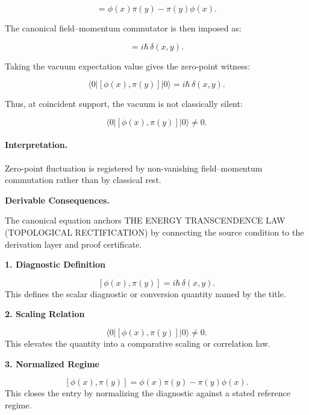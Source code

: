 \begin{equation}
[\phi(x),\pi(y)]
=
\phi(x)\pi(y)-\pi(y)\phi(x).
\end{equation}

The canonical field--momentum commutator is then imposed as:

\begin{equation}
[\phi(x),\pi(y)] = i\hbar\,\delta(x,y).
\end{equation}

Taking the vacuum expectation value gives the zero-point witness:

\begin{equation}
\langle 0|[\phi(x),\pi(y)]|0\rangle
=
i\hbar\,\delta(x,y).
\end{equation}

Thus, at coincident support, the vacuum is not classically silent:

\begin{equation}
\boxed{
\langle 0|[\phi(x),\pi(y)]|0\rangle \neq 0 .
}
\end{equation}

\paragraph{Interpretation.}
Zero-point fluctuation is registered by non-vanishing field--momentum commutation rather than by classical rest.

\par\vspace{0.35em}
\noindent\textbf{Derivable Consequences.}\quad
\begingroup
\footnotesize
\raggedright
The canonical equation anchors THE ENERGY TRANSCENDENCE LAW (TOPOLOGICAL RECTIFICATION) by connecting the source condition to the derivation layer and proof certificate.
\par\endgroup

\noindent\textbf{1. Diagnostic Definition}\par
\[
[\phi(x),\pi(y)] = i\hbar\,\delta(x,y).
\]
\noindent This defines the scalar diagnostic or conversion quantity named by the title.\par
\noindent\textbf{2. Scaling Relation}\par
\[
\langle 0|[\phi(x),\pi(y)]|0\rangle \neq 0.
\]
\noindent This elevates the quantity into a comparative scaling or correlation law.\par
\noindent\textbf{3. Normalized Regime}\par
\[
[\phi(x),\pi(y)] = \phi(x)\pi(y)-\pi(y)\phi(x).
\]
\noindent This closes the entry by normalizing the diagnostic against a stated reference regime.\par


